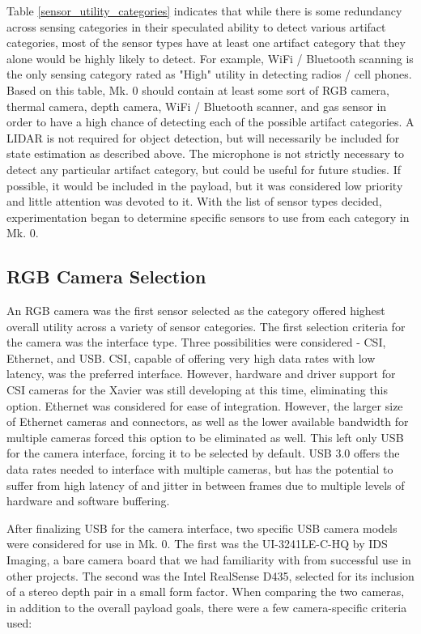 Table \ref{sensor_utility_categories} indicates that while there is some redundancy across sensing categories in their speculated ability to detect various artifact categories, most of the sensor types have at least one artifact category that they alone would be highly likely to detect. For example, WiFi / Bluetooth scanning is the only sensing category rated as "High" utility in detecting radios / cell phones. Based on this table, Mk. 0 should contain at least some sort of RGB camera, thermal camera, depth camera, WiFi / Bluetooth scanner, and gas sensor in order to have a high chance of detecting each of the possible artifact categories. A LIDAR is not required for object detection, but will necessarily be included for state estimation as described above. The microphone is not strictly necessary to detect any particular artifact category, but could be useful for future studies. If possible, it would be included in the payload, but it was considered low priority and little attention was devoted to it. With the list of sensor types decided, experimentation began to determine specific sensors to use from each category in Mk. 0.

\subsection{RGB Camera Selection}

An RGB camera was the first sensor selected as the category offered highest overall utility across a variety of sensor categories. The first selection criteria for the camera was the interface type. Three possibilities were considered - CSI, Ethernet, and USB. CSI, capable of offering very high data rates with low latency, was the preferred interface. However, hardware and driver support for CSI cameras for the Xavier was still developing at this time, eliminating this option. Ethernet was considered for ease of integration. However, the larger size of Ethernet cameras and connectors, as well as the lower available bandwidth for multiple cameras forced this option to be eliminated as well. This left only USB for the camera interface, forcing it to be selected by default. USB 3.0 offers the data rates needed to interface with multiple cameras, but has the potential to suffer from high latency of and jitter in between frames due to multiple levels of hardware and software buffering.

After finalizing USB for the camera interface, two specific USB camera models were considered for use in Mk. 0. The first was the UI-3241LE-C-HQ by IDS Imaging, a bare camera board that we had familiarity with from successful use in other projects. The second was the Intel RealSense D435, selected for its inclusion of a stereo depth pair in a small form factor. When comparing the two cameras, in addition to the overall payload goals, there were a few camera-specific criteria used:
	
